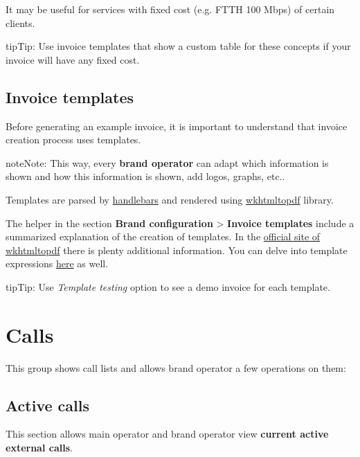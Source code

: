 \documentclass[letterpaper,10pt,english]{sphinxmanual}
\begin{document}
It may be useful for services with fixed cost (e.g. FTTH 100 Mbps) of certain clients.

\begin{notice}{tip}{Tip:}
Use invoice templates that show a custom table for these concepts if your invoice will have any fixed cost.
\end{notice}


\subsection{Invoice templates}
\label{administration_portal/brand/invoicing/invoice_templates::doc}\label{administration_portal/brand/invoicing/invoice_templates:invoice-templates}
Before generating an example invoice, it is important to understand that invoice
creation process uses templates.

\begin{notice}{note}{Note:}
This way, every \textbf{brand operator} can adapt which information
is shown and how this information is shown, add logos, graphs, etc..
\end{notice}

Templates are parsed by \href{https://github.com/XaminProject/handlebars.php}{handlebars} and rendered
using \href{https://wkhtmltopdf.org/}{wkhtmltopdf} library.

The helper in the section \textbf{Brand configuration} \textgreater{} \textbf{Invoice templates} include
a summarized explanation of the creation of templates. In the \href{https://wkhtmltopdf.org/usage/wkhtmltopdf.txt}{official site of wkhtmltopdf} there is plenty additional information.
You can delve into template expressions \href{http://handlebarsjs.com/expressions.html}{here} as well.

\begin{notice}{tip}{Tip:}
Use \emph{Template testing} option to see a demo invoice for each template.
\end{notice}


\section{Calls}
\label{administration_portal/brand/calls/index::doc}\label{administration_portal/brand/calls/index:calls}
This group shows call lists and allows brand operator a few operations on them:


\subsection{Active calls}
\label{administration_portal/brand/calls/active_calls::doc}\label{administration_portal/brand/calls/active_calls:active-calls}
This section allows main operator and brand operator view \textbf{current active external calls}.
\end{document}
